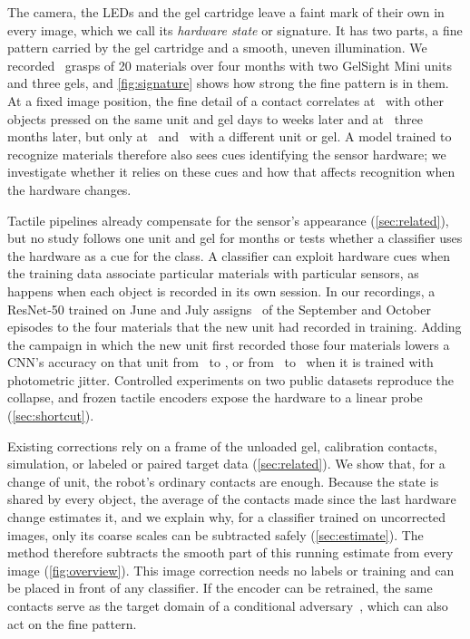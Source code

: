 The camera, the LEDs and the gel cartridge leave a faint mark of their own in every image, which we call its \emph{hardware state} or signature. It has two parts, a fine pattern carried by the gel cartridge and a smooth, uneven illumination. We recorded \EpRecorded\ grasps of 20 materials over four months with two GelSight Mini units and three gels, and \cref{fig:signature} shows how strong the fine pattern is in them. At a fixed image position, the fine detail of a contact correlates at \HwFarWeeks\ with other objects pressed on the same unit and gel days to weeks later and at \HwFarMonths\ three months later, but only at \HwFarOtherUnit\ and \HwFarOtherGel\ with a different unit or gel. A model trained to recognize materials therefore also sees cues identifying the sensor hardware; we investigate whether it relies on these cues and how that affects recognition when the hardware changes.

Tactile pipelines already compensate for the sensor's appearance (\cref{sec:related}), but no study follows one unit and gel for months or tests whether a classifier uses the hardware as a cue for the class. A classifier can exploit hardware cues when the training data associate particular materials with particular sensors, as happens when each object is recorded in its own session. In our recordings, a ResNet-50 trained on June and July assigns \XpIntroUnitTwoShare\pct\ of the September and October episodes to the four materials that the new unit had recorded in training. Adding the campaign in which the new unit first recorded those four materials lowers a CNN's accuracy on that unit from \ThirteenABtoDRaw\ to \ThirteenABCtoDRaw\pct, or from \ThirteenABtoDAugRaw\ to \ThirteenABCtoDAugRaw\pct\ when it is trained with photometric jitter. Controlled experiments on two public datasets reproduce the collapse, and frozen tactile encoders expose the hardware to a linear probe (\cref{sec:shortcut}).

Existing corrections rely on a frame of the unloaded gel, calibration contacts, simulation, or labeled or paired target data (\cref{sec:related}). We show that, for a change of unit, the robot's ordinary contacts are enough. Because the state is shared by every object, the average of the contacts made since the last hardware change estimates it, and we explain why, for a classifier trained on uncorrected images, only its coarse scales can be subtracted safely (\cref{sec:estimate}). The method therefore subtracts the smooth part of this running estimate from every image (\cref{fig:overview}). This image correction needs no labels or training and can be placed in front of any classifier. If the encoder can be retrained, the same contacts serve as the target domain of a conditional adversary~\cite{long2018cdan}, which can also act on the fine pattern.

